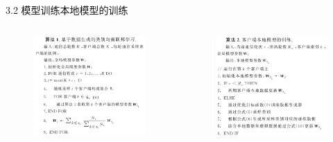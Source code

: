 \documentclass{sintefbeamer}
\theoremstyle{definition}
\begin{document}
\begin{frame}{3.2 模型训练}{本地模型的训练}


\begin{columns}
\begin{column}{0.5\textwidth}
\begin{figure}[ht]
\centering
\includegraphics[width=1\textwidth]{images/algo1}
\end{figure}

\end{column}
\begin{column}{0.5\textwidth}
\begin{figure}[ht]
\centering
\includegraphics[width=1\textwidth]{images/algo2}
\end{figure}
\end{column}
\end{columns}


\end{frame}
\end{document}
